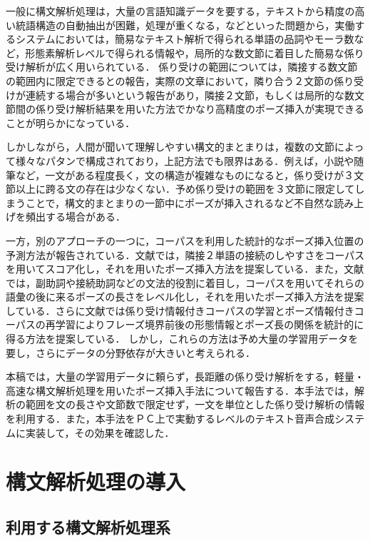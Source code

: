 一般に構文解析処理は，大量の言語知識データを要する，テキストから精度の高い統語構造の自動抽出が困難，処理が重くなる，などといった問題から，実働するシステムにおいては，簡易なテキスト解析で得られる単語の品詞やモーラ数など，形態素解析レベルで得られる情報や，局所的な数文節に着目した簡易な係り受け解析が広く用いられている\cite[など]{宮崎1986,浅野1995,鈴木1995,澗潟1996,塚田1996,Tsukada1996,海木1996}．
係り受けの範囲については，隣接する数文節の範囲内に限定できるとの報告\cite{箱田1989,鈴木1995}，実際の文章において，隣り合う２文節の係り受けが\mbox{連続する場合が多いという}\mbox{報告\cite{丸山1992,張1997}があり}，隣接２文節，もしくは局所的\mbox{な数文節間の係り受}け解析結果を用いた方法でかなり高精度のポーズ挿入が実現できることが明らかになっている．

しかしながら，人間が聞いて理解しやすい構文的まとまりは，複数の文節によって様々なパタンで構成されており，上記方法でも限界はある．例えば，小説や随筆など，一文がある程度長く，文の構造が複雑なものになると，係り受けが３文節以上に跨る文の存在は少なくない．予め係り受けの範囲を３文節に限定してしまうことで，構文的まとまりの一節中にポーズが挿入されるなど不自然な読み上げを頻出する場合がある．

一方，別のアプローチの一つに，コーパスを利用した統計的なポーズ挿入位置の予測方法が報告されている．文献\cite{Iwata1990}では，隣接２単語の接続のしやすさを\mbox{コーパスを用い}てスコア化し，それを用いたポーズ挿入方法を提案している．また，文献\cite{Doi1994}では，副助詞や接続助詞などの文法的役割に着目し，コーパスを用いてそれらの語彙の後に来るポーズの長さをレベル化し，それを用いたポーズ挿入方法を提案している．さらに文献\cite{藤尾1997}では係り受け情報付きコーパスの学習とポーズ情報付きコーパスの再学習によりフレーズ境界前後の形態情報とポーズ長の関係を統計的に得る方法を提案している．
しかし，これらの方法は予め大量の学習用データを要し，さらにデータの分野依存が大きいと考えられる．

本稿では，大量の学習用データに頼らず，長距離の係り受け解析をする，軽量・高速な構文解析処理を用いたポーズ挿入手法について報告する．本手法では，解析の範囲を文の長さや文節数で限定せず，一文を単位とした係り受け解析の情報を利用する．また，本手法をＰＣ上で実動するレベルのテキスト音声合成システムに実装して，その効果を確認した．

\section{構文解析処理の導入}

\subsection{利用する構文解析処理系}

